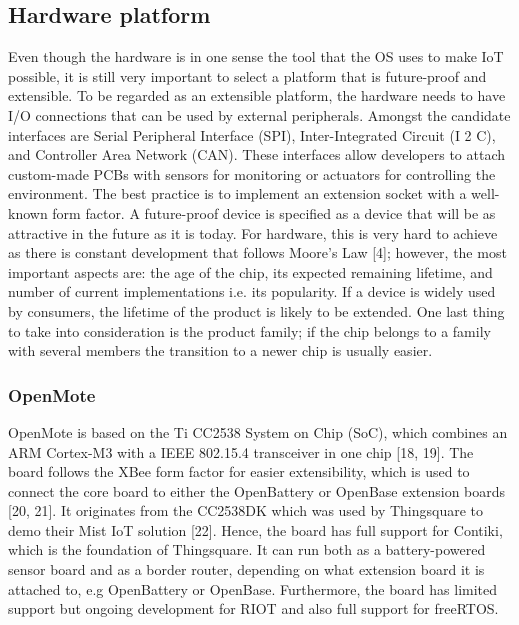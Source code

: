 \subsection{Hardware platform}


Even though the hardware is in one sense the tool that the OS uses to make IoT possible,
	it is still very important to select a platform that is future-proof and extensible.
To be regarded as an extensible platform,
	the hardware needs to have I/O connections that can be used by external peripherals.
Amongst the candidate interfaces are Serial Peripheral Interface (SPI),
	Inter-Integrated Circuit (I 2 C),
	and Controller Area Network (CAN).
These interfaces allow developers to attach custom-made PCBs with sensors for monitoring or actuators for controlling the environment.
The best practice is to implement an extension socket with a well-known form factor.
A future-proof device is specified as a device that will be as attractive in the future as it is today.
For hardware,
	this is very hard to achieve as there is constant development that follows Moore’s Law [4];
	however,
	the most important aspects are:
	the age of the chip,
	its expected remaining lifetime,
	and number of current implementations i.e.
its popularity.
If a device is widely used by consumers,
	the lifetime of the product is likely to be extended.
One last thing to take into consideration is the product family;
	if the chip belongs to a family with several members the transition to a newer chip is usually easier.

\subsubsection{OpenMote}

OpenMote is based on the Ti CC2538 System on Chip (SoC),
	which combines an ARM Cortex-M3 with a IEEE 802.15.4 transceiver in one chip [18, 19].
The board follows the XBee form factor for easier extensibility,
	which is used to connect the core board to either the OpenBattery or OpenBase extension boards [20, 21].
It originates from the CC2538DK which was used by Thingsquare to demo their Mist IoT solution [22].
Hence,
	the board has full support for Contiki,
	which is the foundation of Thingsquare.
It can run both as a battery-powered sensor board and as a border router,
	depending on what extension board it is attached to,
	e.g OpenBattery or OpenBase.
Furthermore,
	the board has limited support but ongoing development for RIOT and also full support for freeRTOS.

